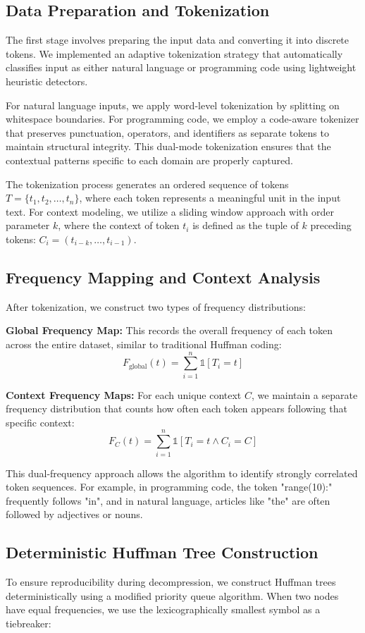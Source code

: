 \documentclass[conference]{IEEEtran}
\begin{document}
\subsection{Data Preparation and Tokenization}
The first stage involves preparing the input data and converting it into discrete tokens. We implemented an adaptive tokenization strategy that automatically classifies input as either natural language or programming code using lightweight heuristic detectors.

For natural language inputs, we apply word-level tokenization by splitting on whitespace boundaries. For programming code, we employ a code-aware tokenizer that preserves punctuation, operators, and identifiers as separate tokens to maintain structural integrity. This dual-mode tokenization ensures that the contextual patterns specific to each domain are properly captured.

The tokenization process generates an ordered sequence of tokens \(T = \{t_1, t_2, \ldots, t_n\}\), where each token represents a meaningful unit in the input text. For context modeling, we utilize a sliding window approach with order parameter \(k\), where the context of token \(t_i\) is defined as the tuple of \(k\) preceding tokens: \(C_i = (t_{i-k}, \ldots, t_{i-1})\).

\subsection{Frequency Mapping and Context Analysis}
After tokenization, we construct two types of frequency distributions:

\textbf{Global Frequency Map:} This records the overall frequency of each token across the entire dataset, similar to traditional Huffman coding:
\[
F_{\text{global}}(t) = \sum_{i=1}^{n} \mathbb{1}[T_i = t]
\]

\textbf{Context Frequency Maps:} For each unique context \(C\), we maintain a separate frequency distribution that counts how often each token appears following that specific context:
\[
F_{C}(t) = \sum_{i=1}^{n} \mathbb{1}[T_i = t \land C_i = C]
\]

This dual-frequency approach allows the algorithm to identify strongly correlated token sequences. For example, in programming code, the token "range(10):" frequently follows "in", and in natural language, articles like "the" are often followed by adjectives or nouns.

\subsection{Deterministic Huffman Tree Construction}
To ensure reproducibility during decompression, we construct Huffman trees deterministically using a modified priority queue algorithm. When two nodes have equal frequencies, we use the lexicographically smallest symbol as a tiebreaker:
\end{document}
